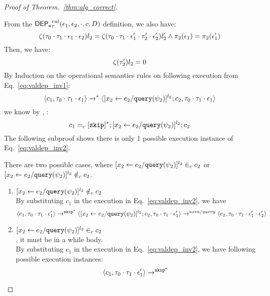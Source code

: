 \begin{proof}[Proof of Theorem.~\ref{thm:alg_correct}]
\begin{case}[$P(\cdot)$]
\begin{equation}
\end{equation}
%
From the $\mathsf{DEP_{\mathtt{e}}}^{val}_{\mathtt{\tau}}(\mathtt{\epsilon}_1, \mathtt{\epsilon}_2, \cdot, c, D)$ definition, we also have:
\[
  \mathtt{\zeta}(\mathtt{\tau}_0 \cdot \mathtt{\tau}_1 \cdot \mathtt{\epsilon}_1 \cdot \mathtt{\epsilon}_2) l_2 = 
  \mathtt{\zeta}(\mathtt{\tau}_0 \cdot \mathtt{\tau}_1 \cdot \mathtt{\epsilon}_1' \cdot \mathtt{\tau}_2' \cdot \mathtt{\epsilon}_2') l_2'
  \land 
  \pi_2(\mathtt{\epsilon}_1) = \pi_2(\mathtt{\epsilon}_1')
\] 
Then, we have:
\begin{equation}
\label{eq:valdep_invn}
  \mathtt{\zeta}(\mathtt{\tau}_2') l_2 = 0
\end{equation}
%
%
%
 By Induction on the operational semantics rules on following execution from Eq.~\ref{eq:valdep_inv1}:
 \[\langle c_1, \mathtt{\tau}_0 \cdot \mathtt{\tau}_1 \cdot \mathtt{\epsilon}_1 \rangle
  \rightarrow^{*} 
  \langle [\mathrel{ {x}_2 \leftarrow e_2 / {\tt query}(\psi_2) }]^{l_2};{c}_2, 
  \mathtt{\tau}_0 \cdot \mathtt{\tau}_1 \cdot \mathtt{\epsilon}_1 \rangle \]
 we know by  , :
 \[
 c_1 =_c 
 [\mathtt{skip}]{}^*;[\mathrel{ {x}_2 \leftarrow e_2 / {\tt query}(\psi_2) }]^{l_2};{c}_2
 \]
The following subproof shows there is only 1 possible execution instance of Eq.~\ref{eq:valdep_inv2}.
\begin{subproof}[Subproof]
\label{pf:noiteration_inv2}
There are two possible cases, 
where $[\mathrel{ {x}_2 \leftarrow e_2 / {\tt query}(\psi_2) }]^{l_2} \in_c c_2$ 
or $[\mathrel{ {x}_2 \leftarrow e_2 / {\tt query}(\psi_2) }]^{l_2} \notin_c c_2$.
%
\begin{enumerate}
\item{$[\mathrel{ {x}_2 \leftarrow e_2 / {\tt query}(\psi_2) }]^{l_2}\notin_c c_2$}
\\
By substituting $c_1$ in the execution in Eq.~\ref{eq:valdep_inv2}, we have 
  \[
  \langle c_1, \mathtt{\tau}_0 \cdot \mathtt{\tau}_1 \cdot \mathtt{\epsilon}_1' \rangle 
  \rightarrow^{\mathtt{skip}^*} 
  \langle [\mathrel{ {x}_2 \leftarrow e_2 / {\tt query}(\psi_2) }]^{l_2} ; {c}_2, \mathtt{\tau}_0 \cdot \mathtt{\tau}_1 \cdot \mathtt{\epsilon}_1' \rangle 
  \rightarrow^{assn/query} 
  \langle {c}_2,  \mathtt{\tau}_0 \cdot \mathtt{\tau}_1 \cdot \mathtt{\epsilon}_1' \cdot \mathtt{\epsilon}_2' \rangle 
 \]
%
\item{$[\mathrel{ {x}_2 \leftarrow e_2 / {\tt query}(\psi_2) }]^{l_2} \in_c c_2$}
\\
, it must be in a while body.
\\
 By substituting $c_1$ in the execution in Eq.~\ref{eq:valdep_inv2}, we have following possible execution instances:
  \[
  \langle c_1, \mathtt{\tau}_0 \cdot \mathtt{\tau}_1 \cdot \mathtt{\epsilon}_1' \rangle 
  \rightarrow^{\mathtt{skip}^*} 
\]
\end{enumerate}
\end{subproof}
\end{case}
\end{proof}

